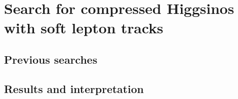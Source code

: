 \chapter{Search for compressed Higgsinos  with soft lepton tracks}


\section{Previous searches}





















\clearpage
\section{Results and interpretation}


